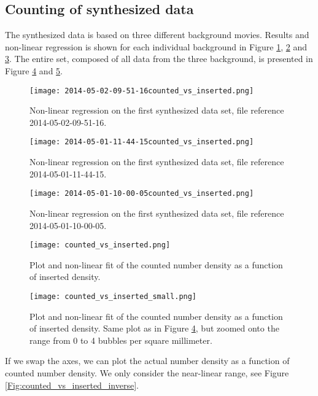 \clearpage
\subsection{Counting of synthesized data}
The synthesized data is based on three different background movies. Results and non-linear regression is shown for each individual background in Figure \ref{Fig:counted_vs_inserted1}, \ref{Fig:counted_vs_inserted2} and \ref{Fig:counted_vs_inserted3}. The entire set, composed of all data from the three background, is presented in Figure \ref{Fig:counted_vs_inserted_all} and \ref{Fig:counted_vs_inserted_all_small}.
\begin{figure}[h]
  \centering
  \texttt{[image: 2014-05-02-09-51-16counted\_vs\_inserted.png]}
  \caption{Non-linear regression on the first synthesized data set, file reference 2014-05-02-09-51-16.}
  \label{Fig:counted_vs_inserted1}
\end{figure}
\begin{figure}[h]
  \centering
  \texttt{[image: 2014-05-01-11-44-15counted\_vs\_inserted.png]}
  \caption{Non-linear regression on the first synthesized data set, file reference 2014-05-01-11-44-15.}
  \label{Fig:counted_vs_inserted2}
\end{figure}
\begin{figure}[h]
  \centering
  \texttt{[image: 2014-05-01-10-00-05counted\_vs\_inserted.png]}
  \caption{Non-linear regression on the first synthesized data set, file reference 2014-05-01-10-00-05.}
  \label{Fig:counted_vs_inserted3}
\end{figure}

\begin{figure}[h]
  \centering
  \texttt{[image: counted\_vs\_inserted.png]}
  \caption{Plot and non-linear fit of the counted number density as a function of inserted density.}
  \label{Fig:counted_vs_inserted_all}
\end{figure}


\begin{figure}[h]
  \centering
  \texttt{[image: counted\_vs\_inserted\_small.png]}
  \caption{Plot and non-linear fit of the counted number density as a function of inserted density. Same plot as in Figure \ref{Fig:counted_vs_inserted_all}, but zoomed onto the range from 0 to 4 bubbles per square millimeter.}
  \label{Fig:counted_vs_inserted_all_small}
\end{figure}

If we swap the axes, we can plot the actual number density as a function of counted number density. We only consider the near-linear range, see Figure \ref{Fig:counted_vs_inserted_inverse}. 

